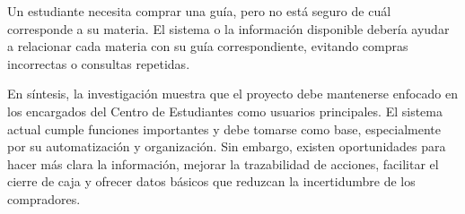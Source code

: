 \documentclass[12pt,letterpaper]{article}
\begin{document}
Un estudiante necesita comprar una guía, pero no está seguro de cuál corresponde a su materia. El sistema o la información disponible debería ayudar a relacionar cada materia con su guía correspondiente, evitando compras incorrectas o consultas repetidas.

En síntesis, la investigación muestra que el proyecto debe mantenerse enfocado en los encargados del Centro de Estudiantes como usuarios principales. El sistema actual cumple funciones importantes y debe tomarse como base, especialmente por su automatización y organización. Sin embargo, existen oportunidades para hacer más clara la información, mejorar la trazabilidad de acciones, facilitar el cierre de caja y ofrecer datos básicos que reduzcan la incertidumbre de los compradores.
\end{document}

